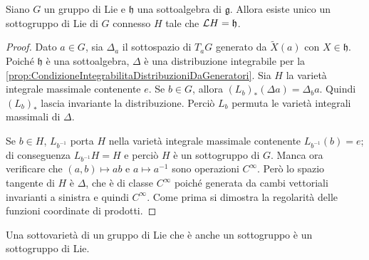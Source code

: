 \begin{theorem}
	Siano $G$ un gruppo di Lie e $\mathfrak h$ una sottoalgebra di $\mathfrak g$. Allora esiste unico un sottogruppo di Lie di $G$ connesso $H$ tale che $\mathcal L H = \mathfrak h$.
\end{theorem}
\begin{proof}
	Dato $a \in G$, sia $\Delta_a$ il sottospazio di $T_aG$ generato da $\tilde X(a)$ con $X\in \mathfrak h$.
	Poiché $\mathfrak h$ è una sottoalgebra, $\Delta$ è una distribuzione integrabile per la \cref{prop:CondizioneIntegrabilitaDistribuzioniDaGeneratori}.
	Sia $H$ la varietà integrale massimale contenente $e$. Se $b \in G$, allora $(L_b)_* (\Delta a) = \Delta_b a$. Quindi $(L_b)_*$ lascia invariante la distribuzione. Perciò $L_b$ permuta le varietà integrali massimali di $\Delta$.
	
	Se $b\in H$, $L_{b^{-1}}$ porta $H$ nella varietà integrale massimale contenente $L_{b^{-1}} (b) =e$; di conseguenza $L_{b^{-1}} H = H$ e perciò $H$ è un sottogruppo di $G$.
	Manca ora verificare che $(a,b) \mapsto ab$ e $a\mapsto a^{-1}$ sono operazioni $C^\infty$.
	Però lo spazio tangente di $H$ è $\Delta$, che è di classe $C^\infty$ poiché generata da cambi vettoriali invarianti a sinistra e quindi $C^\infty$.
	Come prima si dimostra la regolarità delle funzioni coordinate di prodotti.
\end{proof}

\begin{remark}
	Una sottovarietà di un gruppo di Lie che è anche un sottogruppo è un sottogruppo di Lie.
\end{remark}










































